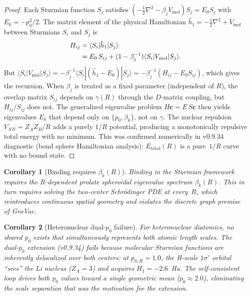 \documentclass[aps,pra,twocolumn,superscriptaddress,longbibliography]{revtex4-2}
\newtheorem{corollary}{Corollary}
\begin{document}
\begin{proof}
Each Sturmian function $S_j$ satisfies
$(-\tfrac{1}{2}\nabla^2 - \beta_j V_{\text{mol}}) S_j = E_0 S_j$
with $E_0 = -p_0^2/2$.  The matrix element of the physical Hamiltonian
$\hat{h}_1 = -\tfrac{1}{2}\nabla^2 + V_{\text{mol}}$ between Sturmians
$S_i$ and $S_j$ is
\begin{align}
H_{ij} &= \langle S_i | \hat{h}_1 | S_j \rangle \notag \\
       &= E_0\, S_{ij} + (1 - \beta_j^{-1})
          \langle S_i | V_{\text{mol}} | S_j \rangle.
\end{align}
But $\langle S_i | V_{\text{mol}} | S_j \rangle
= -\beta_j^{-1}\langle S_i | (\hat{h}_1 - E_0) | S_j \rangle
= -\beta_j^{-1}(H_{ij} - E_0 S_{ij})$, which gives the recursion.
When $\beta_j$ is treated as a fixed parameter (independent of $R$),
the overlap matrix $S_{ij}$ depends on $\gamma(R)$ through the
$D$-matrix coupling, but $H_{ij}/S_{ij}$ does not.  The generalized
eigenvalue problem $H\mathbf{c} = E\, S\mathbf{c}$ then yields
eigenvalues $E_k$ that depend only on $\{p_0, \beta_k\}$, not on
$\gamma$.  The nuclear repulsion $V_{NN} = Z_A Z_B / R$ adds a purely
$1/R$ potential, producing a monotonically repulsive total energy with
no minimum.  This was confirmed numerically in v0.9.34 diagnostic
(bond sphere Hamiltonian analysis): $E_{\text{total}}(R)$ is a
pure~$1/R$ curve with no bound state.
\end{proof}

\begin{corollary}[Binding requires $\beta_k(R)$]
\label{cor:binding}
Binding in the Sturmian framework requires the $R$-dependent prolate
spheroidal eigenvalue spectrum $\beta_k(R)$.  This in turn requires
solving the two-center Schr\"odinger PDE at every~$R$, which
reintroduces continuous spatial geometry and violates the discrete graph
premise of GeoVac.
\end{corollary}

\begin{corollary}[Heteronuclear dual-$p_0$ failure]
\label{cor:dual_p0}
For heteronuclear diatomics, no shared $p_0$ exists that simultaneously
represents both atomic length scales.  The dual-$p_0$ extension
(v0.9.34) fails because molecular Sturmian functions are inherently
delocalized over both centers: at $p_{0,H} = 1.0$, the H-scale
$1\sigma'$ orbital ``sees'' the Li nucleus ($Z_A = 3$) and acquires
$H_1 = -2.6$~Ha.  The self-consistent loop drives both $p_0$ values
toward a single geometric mean ($p_0 \approx 2.0$), eliminating the
scale separation that was the motivation for the extension.
\end{corollary}
\end{document}
